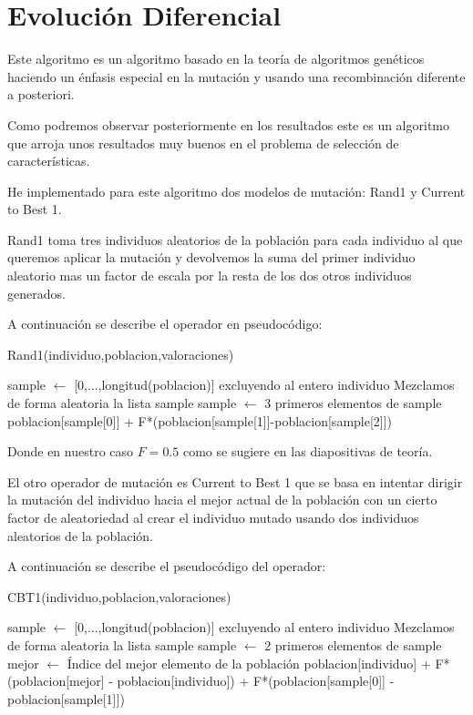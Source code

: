 \documentclass[12pt,a4paper]{article}
\begin{document}
	\newpage
	
	\section{Evolución Diferencial}
	\label{sec:DE}
	
	Este algoritmo es un algoritmo basado en la teoría de algoritmos genéticos haciendo un énfasis especial en la mutación y usando una recombinación diferente a posteriori. 
	
	Como podremos observar posteriormente en los resultados este es un algoritmo que arroja unos resultados muy buenos en el problema de selección de características.
	
	He implementado para este algoritmo dos modelos de mutación: Rand1 y Current to Best 1.
	
	Rand1 toma tres individuos aleatorios de la población para cada individuo al que queremos aplicar la mutación y devolvemos la suma del primer individuo aleatorio mas un factor de escala por la resta de los dos otros individuos generados.

	A continuación se describe el operador en pseudocódigo:
	
	\begin{algorithm}
		\caption{Rand1(individuo,poblacion,valoraciones)}
		\begin{algorithmic}			
			\STATE sample $\leftarrow$ [0,...,longitud(poblacion)] excluyendo al entero individuo
			\STATE Mezclamos de forma aleatoria la lista sample
			\STATE sample $\leftarrow$ 3 primeros elementos de sample
			\STATE
			\RETURN poblacion[sample[0]] + F*(poblacion[sample[1]]-poblacion[sample[2]])
		\end{algorithmic}
	\end{algorithm}
	
	Donde en nuestro caso $F=0.5$ como se sugiere en las diapositivas de teoría.
	
	El otro operador de mutación  es Current to Best 1 que se basa en intentar dirigir la mutación del individuo hacia el mejor actual de la población con un cierto factor de aleatoriedad al crear el individuo mutado usando dos individuos aleatorios de la población.
	
	A continuación se describe el pseudocódigo del operador:
	
	\begin{algorithm}
		\caption{CBT1(individuo,poblacion,valoraciones)}
		\begin{algorithmic}			
			\STATE sample $\leftarrow$ [0,...,longitud(poblacion)] excluyendo al entero individuo
			\STATE Mezclamos de forma aleatoria la lista sample
			\STATE sample $\leftarrow$ 2 primeros elementos de sample
			\STATE
			\STATE mejor $\leftarrow$ Índice del mejor elemento de la población
			\STATE
			\RETURN poblacion[individuo] + F*(poblacion[mejor] - poblacion[individuo]) + F*(poblacion[sample[0]] - poblacion[sample[1]])
		\end{algorithmic}
	\end{algorithm}
	
\end{document}
